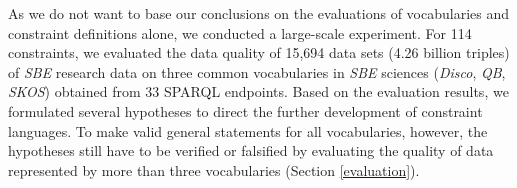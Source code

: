 \documentclass{llncs}
\begin{document}
As we do not want to base our conclusions on the evaluations of vocabularies and constraint definitions alone, we conducted a large-scale experiment.
For 114 constraints, we evaluated the data quality of 15,694 data sets (4.26 billion triples) of \emph{SBE} research data on three common vocabularies in \emph{SBE} sciences (\emph{Disco}, \emph{QB}, \emph{SKOS}) obtained from 33 SPARQL endpoints.
Based on the evaluation results,
we formulated several hypotheses to direct the further development of constraint languages.
To make valid general statements for all vocabularies, however,
the hypotheses still have to be verified or falsified
by evaluating the quality of data represented by more than three vocabularies (Section \ref{evaluation}).
\end{document}
